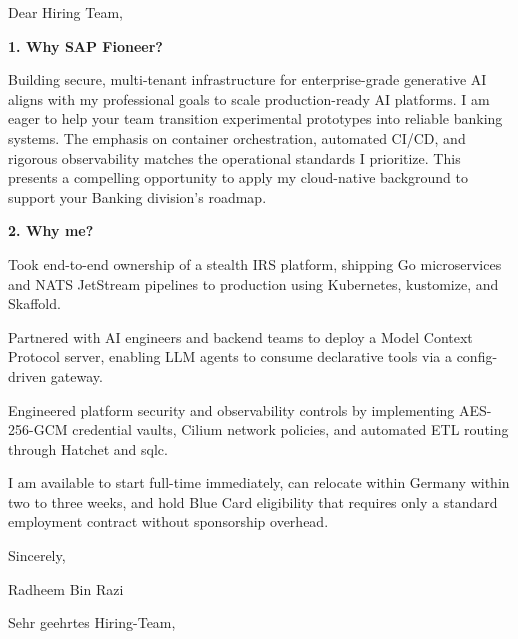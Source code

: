 \documentclass[11pt,a4paper]{coverletter}
\begin{document}

\opening{Dear Hiring Team,}

\vspace{8pt}\noindent\textbf{1. Why SAP Fioneer?}\par\vspace{3pt}

Building secure, multi-tenant infrastructure for enterprise-grade generative AI aligns with my professional goals to scale production-ready AI platforms. I am eager to help your team transition experimental prototypes into reliable banking systems. The emphasis on container orchestration, automated CI/CD, and rigorous observability matches the operational standards I prioritize. This presents a compelling opportunity to apply my cloud-native background to support your Banking division’s roadmap.

\vspace{8pt}\noindent\textbf{2. Why me?}\par\vspace{3pt}

\bullets

  \item Took end-to-end ownership of a stealth IRS platform, shipping Go microservices and NATS JetStream pipelines to production using Kubernetes, kustomize, and Skaffold.

  \item Partnered with AI engineers and backend teams to deploy a Model Context Protocol server, enabling LLM agents to consume declarative tools via a config-driven gateway.

  \item Engineered platform security and observability controls by implementing AES-256-GCM credential vaults, Cilium network policies, and automated ETL routing through Hatchet and sqlc.

\bulletsend

I am available to start full-time immediately, can relocate within Germany within two to three weeks, and hold Blue Card eligibility that requires only a standard employment contract without sponsorship overhead.

\closing{Sincerely,}{Radheem Bin Razi}

\clearpage
{}


\opening{Sehr geehrtes Hiring-Team,}
\end{document}
